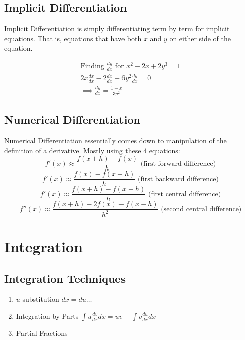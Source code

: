 \documentclass[12pt] {article}
\begin{document}
\subsection*{Implicit Differentiation}
Implicit Differentiation is simply differentiating term by term for implicit equations.
That is, equations that have both $x$ and $y$ on either side of the equation. 
\begin{example}
\begin{gather*}
  \text{Finding } \frac{dy}{dx} \text{ for } x^2-2x+2y^3=1 \\
  2x\frac{dx}{dx} -2\frac{dx}{dx} +6y^2\frac{dy}{dx}=0 \\
  \implies \frac{dy}{dx} = \frac{1-x}{3y^2}
\end{gather*}
\end{example}
\subsection*{Numerical Differentiation}
Numerical Differentiation essentially comes down to manipulation of the definition of a derivative. Mostly using these 4 equations:
\begin{equation*}
  f'(x) \approx \frac{f(x+h)-f(x)}{h} \text{ (first forward difference)}
\end{equation*}
\begin{equation*}
  f'(x) \approx \frac{f(x)-f(x-h)}{h} \text{ (first backward difference)}
\end{equation*}
\begin{equation*}
  f'(x) \approx \frac{f(x+h)-f(x-h)}{h} \text{ (first central difference)}
\end{equation*}
\begin{equation*}
  f''(x) \approx \frac{f(x+h)-2f(x)+f(x-h)}{h^2} \text{ (second central difference)}
\end{equation*}
\section{Integration}
\subsection*{Integration Techniques}
\begin{enumerate}
  \item $u$ substitution $dx=du\dotsc$
  \item Integration by Parts $\int u \frac{dv}{dx} dx = uv - \int v \frac{du}{dx}dx$
  \item Partial Fractions
\end{enumerate}
\end{document}
